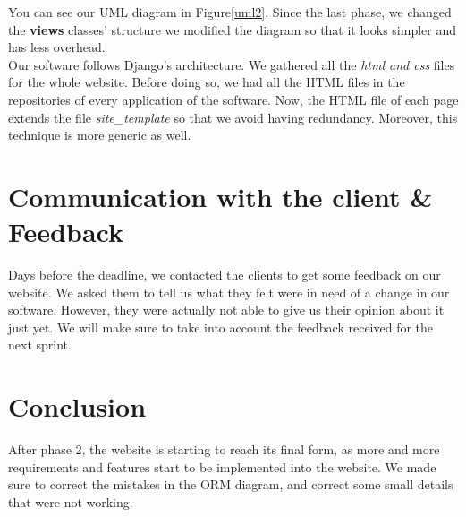 \documentclass[a4paper, 12pt]{article}
\begin{document}
You can see our UML diagram in Figure\ref{uml2}. Since the last phase, we changed the \textbf{views} classes' structure we modified the diagram so that it looks simpler and has less overhead.\\


Our software follows Django's architecture. We gathered all the \textit{html and css} files for the whole website. Before doing so, we had all the HTML files in the repositories of every application of the software. Now, the HTML file of each page extends the file \textit{site\_template} so that we avoid having redundancy. Moreover, this technique is more generic as well. \\
\newpage

\section{Communication with the client \& Feedback}
Days before the deadline, we contacted the clients to get some feedback on our website. We asked them to tell us what they felt were in need of a change in our software. However, they were actually not able to give us their opinion about it just yet. We will make sure to take into account the feedback received for the next sprint. \\

\section{Conclusion}
After phase 2, the website is starting to reach its final form, as more and more requirements and features start to be implemented into the website. We made sure to correct the mistakes in the ORM diagram, and correct some small details that were not working. 
\end{document}
